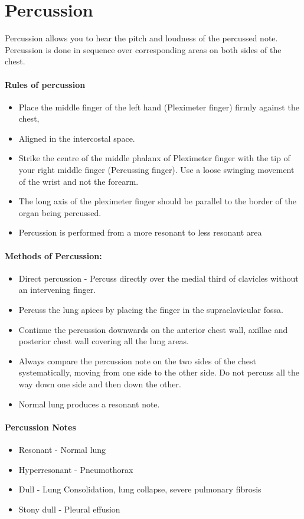 \documentclass[a4paper,12pt,openany,twoside]{book}
\begin{document}
\section*{Percussion}
Percussion  allows  you  to  hear  the  pitch  and  loudness  of  the  percussed  note.  Percussion is done in sequence over corresponding areas on both sides of the chest.

\paragraph{Rules of percussion}
\begin{itemize}
\item{Place the middle finger of the left hand (Pleximeter finger) firmly against the chest,}
\item{Aligned in the intercostal space.}
\item{Strike the centre of the middle phalanx of Pleximeter finger with the tip of your right middle finger (Percussing finger). Use a loose swinging movement of the wrist and not the forearm.}
\item{The long axis of the pleximeter finger should be parallel to the border of the organ being percussed.}
\item{Percussion is performed from a more resonant to less resonant area}
\end{itemize}

\paragraph{Methods of Percussion:}
\begin{itemize}
\item{Direct  percussion  -  Percuss  directly  over  the  medial  third  of  clavicles  without  an intervening finger.}
\item{Percuss the lung apices by placing the finger in the supraclavicular fossa.}
\item{Continue the percussion downwards on the anterior chest wall, axillae and posterior chest wall covering all the lung areas.}
\item{Always  compare  the  percussion  note  on  the  two  sides  of  the  chest systematically, moving from one side to the other side. Do not percuss all the way down one side and then down the other.}
\item{Normal lung produces a resonant note.}
\end{itemize}

\paragraph{Percussion Notes}
\begin{itemize}
\item{Resonant 		- 	Normal lung}
\item{Hyperresonant 	-	Pneumothorax}
\item{Dull 			-	Lung Consolidation, lung collapse, severe pulmonary 					fibrosis }
\item{Stony dull 		-	Pleural effusion}
\end{itemize}
\end{document}
